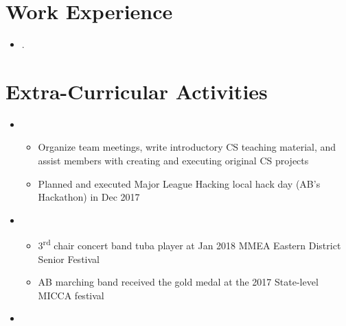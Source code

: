 \documentclass[11pt,a4paper,sans]{moderncv}        %
\begin{document}
\section{Work Experience}
\vspace{5pt}
\begin{itemize}
\item {}
{\vspace{3pt}.}
\end{itemize}

\section{Extra-Curricular Activities}
\vspace{5pt}
\begin{itemize}
\item {}
{\vspace{3pt} 
\begin{itemize}
\item Organize team meetings, write introductory CS teaching material, and assist members with creating and executing original CS projects
\item  Planned and executed Major League Hacking local hack day (AB's Hackathon) in Dec 2017
\end{itemize}}
\item {}
{\vspace{3pt} 
\begin{itemize}
\item 3\textsuperscript{rd} chair concert band tuba player at Jan 2018 MMEA Eastern District Senior Festival
\item AB marching band received the gold medal at the 2017 State-level MICCA festival
\end{itemize}}
\item{}
\end{itemize}
\end{document}
